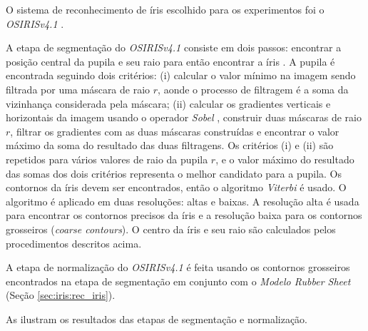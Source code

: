
\par O sistema de reconhecimento de íris escolhido para os experimentos foi o \textit{OSIRISv4.1} \cite{othman2015}.

\par A etapa de segmentação do \textit{OSIRISv4.1} consiste em dois passos: encontrar a posição central da pupila e seu raio para então encontrar a íris \cite{osirisv41_doc}. A pupila é encontrada seguindo dois critérios: (i) calcular o valor mínimo na imagem sendo filtrada por uma máscara de raio $r$, aonde o processo de filtragem é a soma da vizinhança considerada pela máscara; (ii) calcular os gradientes verticais e horizontais da imagem usando o operador \textit{Sobel} \cite{kanopoulos1988}, construir duas máscaras de raio $r$, filtrar os gradientes com as duas máscaras construídas e encontrar o valor máximo da soma do resultado das duas filtragens. Os critérios (i) e (ii)  são repetidos para vários valores de raio da pupila $r$, e o valor máximo do resultado das somas dos dois critérios representa o melhor candidato para a pupila. Os contornos da íris devem ser encontrados, então o algoritmo \textit{Viterbi} \cite{sutra2012} é usado. O algoritmo é aplicado em duas resoluções: altas e baixas. A resolução alta é usada para encontrar os contornos precisos da íris e a resolução baixa para os contornos grosseiros (\textit{coarse contours}). O centro da íris e seu raio são calculados pelos procedimentos descritos acima. 

\par A etapa de normalização do \textit{OSIRISv4.1} é feita usando os contornos grosseiros encontrados na etapa de segmentação em conjunto com o \textit{Modelo Rubber Sheet} (Seção \ref{sec:iris:rec_iris}).

\par As  ilustram os resultados das etapas de segmentação e normalização.


